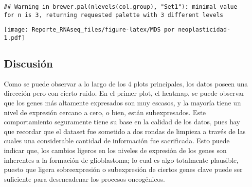 \documentclass[
]{article}
\newenvironment{Shaded}{\begin{snugshade}}{\end{snugshade}}
\newcommand{\AttributeTok}[1]{\textcolor[rgb]{0.77,0.63,0.00}{#1}}
\newcommand{\CommentTok}[1]{\textcolor[rgb]{0.56,0.35,0.01}{\textit{#1}}}
\newcommand{\FunctionTok}[1]{\textcolor[rgb]{0.00,0.00,0.00}{#1}}
\newcommand{\NormalTok}[1]{#1}
\newcommand{\OtherTok}[1]{\textcolor[rgb]{0.56,0.35,0.01}{#1}}
\newcommand{\SpecialCharTok}[1]{\textcolor[rgb]{0.00,0.00,0.00}{#1}}
\newcommand{\StringTok}[1]{\textcolor[rgb]{0.31,0.60,0.02}{#1}}
\begin{document}
\begin{Shaded}
\end{Shaded}

\begin{verbatim}
## Warning in brewer.pal(nlevels(col.group), "Set1"): minimal value for n is 3, returning requested palette with 3 different levels
\end{verbatim}

\begin{Shaded}
\end{Shaded}

\texttt{[image: Reporte\_RNAseq\_files/figure-latex/MDS por neoplasticidad-1.pdf]}

\hypertarget{discusiuxf3n}{%
\subsection{Discusión}\label{discusiuxf3n}}

Como se puede observar a lo largo de los 4 plots principales, los datos
poseen una dirección pero con cierto ruido. En el primer plot, el
heatmap, se puede observar que los genes más altamente expresados son
muy escasos, y la mayoría tiene un nivel de expresión cercano a cero, o
bien, están subexpresados. Este comportamiento seguramente tiene su base
en la calidad de los datos, pues hay que recordar que el dataset fue
sometido a dos rondas de limpieza a través de las cuales una
considerable cantidad de información fue sacrificada. Esto puede indicar
que, los cambios ligeros en los niveles de expresión de los genes son
inherentes a la formación de glioblastoma; lo cual es algo totalmente
plausible, puesto que ligera sobreexpresión o subexpresión de ciertos
genes clave puede ser suficiente para desencadenar los procesos
oncogénicos.
\end{document}
